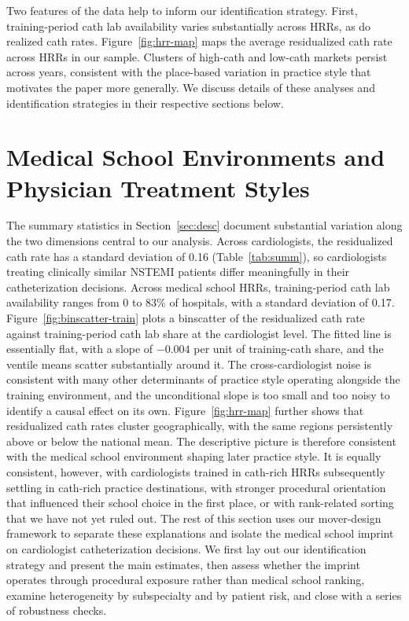 \documentclass[12pt]{article}
\begin{document}
Two features of the data help to inform our identification strategy. First, training-period cath lab availability varies substantially across HRRs, as do realized cath rates. Figure~\ref{fig:hrr-map} maps the average residualized cath rate across HRRs in our sample. Clusters of high-cath and low-cath markets persist across years, consistent with the place-based variation in practice style that motivates the paper more generally. We discuss details of these analyses and identification strategies in their respective sections below.

\section{Medical School Environments and Physician Treatment Styles}\label{sec:imprint}

The summary statistics in Section~\ref{sec:desc} document substantial variation along the two dimensions central to our analysis. Across cardiologists, the residualized cath rate has a standard deviation of 0.16 (Table~\ref{tab:summ}), so cardiologists treating clinically similar NSTEMI patients differ meaningfully in their catheterization decisions. Across medical school HRRs, training-period cath lab availability ranges from 0 to 83\% of hospitals, with a standard deviation of 0.17. Figure~\ref{fig:binscatter-train} plots a binscatter of the residualized cath rate against training-period cath lab share at the cardiologist level. The fitted line is essentially flat, with a slope of $-0.004$ per unit of training-cath share, and the ventile means scatter substantially around it. The cross-cardiologist noise is consistent with many other determinants of practice style operating alongside the training environment, and the unconditional slope is too small and too noisy to identify a causal effect on its own. Figure~\ref{fig:hrr-map} further shows that residualized cath rates cluster geographically, with the same regions persistently above or below the national mean. The descriptive picture is therefore consistent with the medical school environment shaping later practice style. It is equally consistent, however, with cardiologists trained in cath-rich HRRs subsequently settling in cath-rich practice destinations, with stronger procedural orientation that influenced their school choice in the first place, or with rank-related sorting that we have not yet ruled out. The rest of this section uses our mover-design framework to separate these explanations and isolate the medical school imprint on cardiologist catheterization decisions. We first lay out our identification strategy and present the main estimates, then assess whether the imprint operates through procedural exposure rather than medical school ranking, examine heterogeneity by subspecialty and by patient risk, and close with a series of robustness checks.
\end{document}
